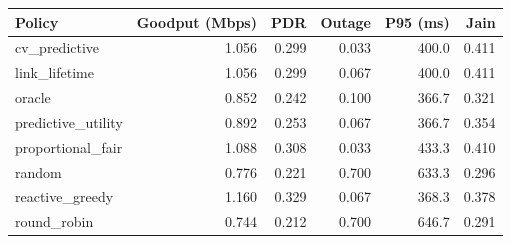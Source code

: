 \begin{tabular}{lrrrrr}
\toprule
Policy & Goodput (Mbps) & PDR & Outage & P95 (ms) & Jain \\
\midrule
cv\_predictive & 1.056 & 0.299 & 0.033 & 400.0 & 0.411 \\
link\_lifetime & 1.056 & 0.299 & 0.067 & 400.0 & 0.411 \\
oracle & 0.852 & 0.242 & 0.100 & 366.7 & 0.321 \\
predictive\_utility & 0.892 & 0.253 & 0.067 & 366.7 & 0.354 \\
proportional\_fair & 1.088 & 0.308 & 0.033 & 433.3 & 0.410 \\
random & 0.776 & 0.221 & 0.700 & 633.3 & 0.296 \\
reactive\_greedy & 1.160 & 0.329 & 0.067 & 368.3 & 0.378 \\
round\_robin & 0.744 & 0.212 & 0.700 & 646.7 & 0.291 \\
\bottomrule
\end{tabular}
